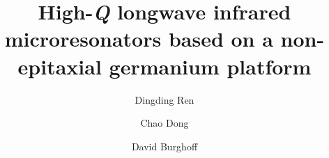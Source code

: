 \documentclass[fleqn,10pt,twocolumn]{wlscirep}
\begin{document}
\title{High-\emph{Q} longwave infrared microresonators based on a non-epitaxial germanium platform}
\author[1,2,*]{Dingding Ren}
\author[1]{Chao Dong}
\author[1]{David Burghoff}





\makeatletter
\renewcommand{\@maketitle}{%
{%
\thispagestyle{empty}%
\vskip-36pt%
{\raggedright\sffamily\bfseries\fontsize{20}{25}\selectfont \@title\par}%
\vskip10pt
{\raggedright\sffamily\fontsize{12}{16}\selectfont  \@author\par}
\vskip25pt%
}%
}%
\makeatother


\maketitle
\newif\ifpreprint
\preprinttrue %

\ifpreprint
\newcommand\figsub[1]{\textbf{#1}.}
\else
\newcommand\figsub[1]{\textbf{#1},}
\fi

\ifpreprint
\newcommand\suppfig[1]{}
\else
\newcommand\suppfig[1]{ (Supplementary Fig. #1)}
\fi

\ifpreprint
\newcommand\introcite[1]{}
\else
\DeclareDocumentCommand{\introcite}{m o o o o o o o o}
{%
\IfNoValueTF{#9}{%
    \IfNoValueTF{#8}{%
        \IfNoValueTF{#7}{%
            \IfNoValueTF{#6}{%
                \IfNoValueTF{#5}{%
                    \IfNoValueTF{#4}{%
                        \IfNoValueTF{#3}{%
                            \IfNoValueTF{#2}{%
                                \cite{#1}}%
                                {\cite{#1,#2}}}%
                            {\cite{#1,#2,#3}}}%
                        {\cite{#1,#2,#3,#4}}}%
                    {\cite{#1,#2,#3,#4,#5}}}%
                {\cite{#1,#2,#3,#4,#5,#6}}}%
            {\cite{#1,#2,#3,#4,#5,#6,#7}}}%
        {\cite{#1,#2,#3,#4,#5,#6,#7,#8}}}%
    {\cite{#1,#2,#3,#4,#5,#6,#7,#8,#9}}%
}%
\fi
\end{document}
